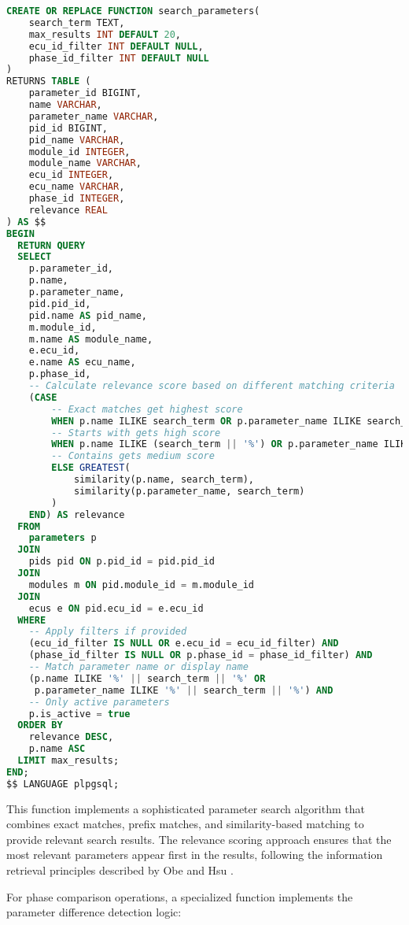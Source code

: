 \begin{lstlisting}[language=SQL, caption={Parameter Search Function}, label={lst:parameter-search}]
CREATE OR REPLACE FUNCTION search_parameters(
    search_term TEXT,
    max_results INT DEFAULT 20,
    ecu_id_filter INT DEFAULT NULL,
    phase_id_filter INT DEFAULT NULL
)
RETURNS TABLE (
    parameter_id BIGINT,
    name VARCHAR,
    parameter_name VARCHAR, 
    pid_id BIGINT,
    pid_name VARCHAR,
    module_id INTEGER,
    module_name VARCHAR,
    ecu_id INTEGER,
    ecu_name VARCHAR,
    phase_id INTEGER,
    relevance REAL
) AS $$
BEGIN
  RETURN QUERY
  SELECT 
    p.parameter_id,
    p.name,
    p.parameter_name,
    pid.pid_id,
    pid.name AS pid_name,
    m.module_id,
    m.name AS module_name,
    e.ecu_id,
    e.name AS ecu_name,
    p.phase_id,
    -- Calculate relevance score based on different matching criteria
    (CASE 
        -- Exact matches get highest score
        WHEN p.name ILIKE search_term OR p.parameter_name ILIKE search_term THEN 1.0
        -- Starts with gets high score
        WHEN p.name ILIKE (search_term || '%') OR p.parameter_name ILIKE (search_term || '%') THEN 0.8
        -- Contains gets medium score
        ELSE GREATEST(
            similarity(p.name, search_term),
            similarity(p.parameter_name, search_term)
        )
    END) AS relevance
  FROM 
    parameters p
  JOIN 
    pids pid ON p.pid_id = pid.pid_id
  JOIN 
    modules m ON pid.module_id = m.module_id
  JOIN 
    ecus e ON pid.ecu_id = e.ecu_id
  WHERE 
    -- Apply filters if provided
    (ecu_id_filter IS NULL OR e.ecu_id = ecu_id_filter) AND
    (phase_id_filter IS NULL OR p.phase_id = phase_id_filter) AND
    -- Match parameter name or display name
    (p.name ILIKE '%' || search_term || '%' OR 
     p.parameter_name ILIKE '%' || search_term || '%') AND
    -- Only active parameters
    p.is_active = true
  ORDER BY 
    relevance DESC, 
    p.name ASC
  LIMIT max_results;
END;
$$ LANGUAGE plpgsql;
\end{lstlisting}

This function implements a sophisticated parameter search algorithm that combines exact matches, prefix matches, and similarity-based matching to provide relevant search results. The relevance scoring approach ensures that the most relevant parameters appear first in the results, following the information retrieval principles described by Obe and Hsu \cite{obe2017postgresql}.

For phase comparison operations, a specialized function implements the parameter difference detection logic:

